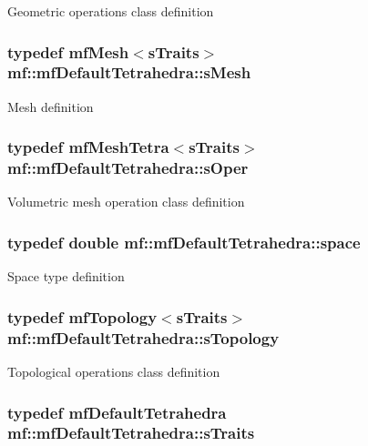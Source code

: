 Geometric operations class definition \hypertarget{structmf_1_1mfDefaultTetrahedra_a6a5c8bc495534e4ad55a1e83e158bb44}{
\subsubsection[{sMesh}]{\setlength{\rightskip}{0pt plus 5cm}typedef {\bf mfMesh}$<${\bf sTraits}$>$ {\bf mf::mfDefaultTetrahedra::sMesh}}}
\label{structmf_1_1mfDefaultTetrahedra_a6a5c8bc495534e4ad55a1e83e158bb44}
Mesh definition \hypertarget{structmf_1_1mfDefaultTetrahedra_ad70fcf2921fe011a2d0a855a0618d27b}{
\subsubsection[{sOper}]{\setlength{\rightskip}{0pt plus 5cm}typedef {\bf mfMeshTetra}$<${\bf sTraits}$>$ {\bf mf::mfDefaultTetrahedra::sOper}}}
\label{structmf_1_1mfDefaultTetrahedra_ad70fcf2921fe011a2d0a855a0618d27b}
Volumetric mesh operation class definition \hypertarget{structmf_1_1mfDefaultTetrahedra_a4e34de315ce8a970390a6e2483f5698b}{
\subsubsection[{space}]{\setlength{\rightskip}{0pt plus 5cm}typedef double {\bf mf::mfDefaultTetrahedra::space}}}
\label{structmf_1_1mfDefaultTetrahedra_a4e34de315ce8a970390a6e2483f5698b}
Space type definition \hypertarget{structmf_1_1mfDefaultTetrahedra_a647cca5ae85b55b22c9e503d4be1d0e6}{
\subsubsection[{sTopology}]{\setlength{\rightskip}{0pt plus 5cm}typedef {\bf mfTopology}$<${\bf sTraits}$>$ {\bf mf::mfDefaultTetrahedra::sTopology}}}
\label{structmf_1_1mfDefaultTetrahedra_a647cca5ae85b55b22c9e503d4be1d0e6}
Topological operations class definition \hypertarget{structmf_1_1mfDefaultTetrahedra_aa7c2b6abf2d636386076db5148ddab07}{
\subsubsection[{sTraits}]{\setlength{\rightskip}{0pt plus 5cm}typedef {\bf mfDefaultTetrahedra} {\bf mf::mfDefaultTetrahedra::sTraits}}}
